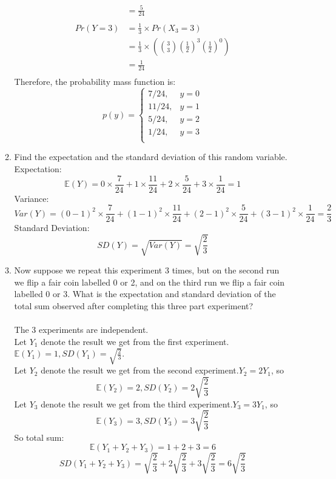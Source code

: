 \documentclass[11pt]{article}
\begin{document}
\begin{enumerate}[label=\textbf{Q \arabic*:},start=1]
\begin{enumerate}
\begin{equation}
\begin{split}
& = \frac{5}{24} \\
\\
Pr(Y=3) & = \frac{1}{3} \times Pr(X_3 = 3) \\
& = \frac{1}{3} \times ({3 \choose 3}(\frac{1}{2})^3(\frac{1}{2})^0) \\
& = \frac{1}{24} \\
\end{split}
\end{equation}
Therefore, the probability mass function is:
  \[
    p(y) = \begin{cases}
        7/24, & y = 0\\
        11/24, & y = 1\\
        5/24, & y = 2\\
        1/24 , & y = 3\\
        \end{cases}
  \]

\item Find the expectation and the standard deviation of this random variable.\\

Expectation:
\[
\mathbb{E}(Y) = 0 \times \frac{7}{24} + 1 \times \frac{11}{24} + 2 \times \frac{5}{24} + 3 \times \frac{1}{24} = 1
\]
Variance:
\[
Var(Y) = (0 - 1)^2 \times \frac{7}{24} + (1 - 1)^2 \times \frac{11}{24} + (2 - 1)^2 \times \frac{5}{24} + (3 - 1)^2 \times \frac{1}{24} = \frac{2}{3}
\]
Standard Deviation:
\[
SD(Y) = \sqrt{Var(Y)} = \sqrt{\frac{2}{3}}
\]


\item Now suppose we repeat this experiment 3 times, but on the second run we flip a fair coin labelled 0 or 2, and on the third run we flip a fair coin labelled 0 or 3. What is the expectation and standard deviation of the total sum observed after completing this three part experiment?\\
\\
The 3 experiments are independent.\\
Let \(Y_1\) denote the result we get from the first experiment. \( \mathbb{E}(Y_1) = 1, SD(Y_1) = \sqrt{\frac{2}{3}} \). \\
Let \(Y_2\) denote the result we get from the second experiment.\(Y_2 = 2 Y_1\), so
\[
\mathbb{E}(Y_2) = 2, SD(Y_2) = 2\sqrt{\frac{2}{3}}
\]
Let \(Y_3\) denote the result we get from the third experiment.\(Y_3 = 3 Y_1\), so
\[
\mathbb{E}(Y_3) = 3, SD(Y_3) = 3 \sqrt{\frac{2}{3}}
\]
So total sum:
\[
\mathbb{E}(Y_1 + Y_2 + Y_3) = 1 + 2 + 3 = 6
\]
\[
SD(Y_1 + Y_2 + Y_3) = \sqrt{\frac{2}{3}} + 2\sqrt{\frac{2}{3}} + 3\sqrt{\frac{2}{3}} = 6\sqrt{\frac{2}{3}}
\]
\end{enumerate}




\end{enumerate}
\end{document}
